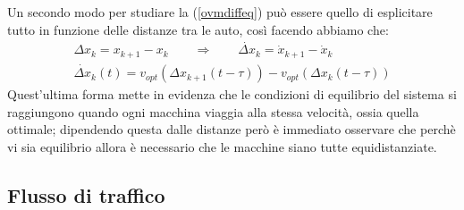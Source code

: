 Un secondo modo per studiare la (\ref{ovmdiffeq}) può essere quello di esplicitare tutto in funzione delle distanze tra le auto, così facendo abbiamo che:
\begin{equation}
	\begin{gathered}
		\Delta x_k=x_{k+1}-x_k \qquad \Rightarrow \qquad \dot{\Delta x}_k=\dot{x}_{k+1}-\dot{x}_{k}\\
		\dot{\Delta x}_k(t)=v_{opt}(\Delta x_{k+1}(t-\tau))-v_{opt}(\Delta x_{k}(t-\tau))
		\label{ovmdiffeqdist}
	\end{gathered}
\end{equation}
Quest'ultima forma mette in evidenza che le condizioni di equilibrio del sistema si raggiungono quando ogni macchina viaggia alla stessa velocità, ossia quella ottimale; dipendendo questa dalle distanze però è immediato osservare che perchè vi sia equilibrio allora è necessario che le macchine siano tutte equidistanziate.
\pagebreak
\subsection{Flusso di traffico}

